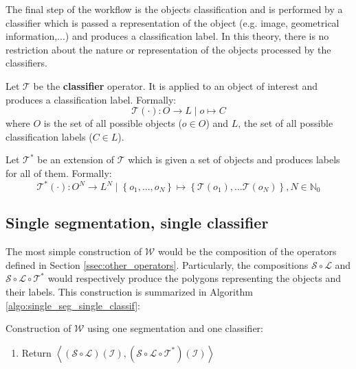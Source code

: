 The final step of the workflow is the objects classification and is performed by a classifier which is passed a representation of the object (e.g. image, geometrical information,...) and produces a classification label. In this theory, there is no restriction about the nature or representation of the objects processed by the classifiers.

\begin{definition} \label{def:classif_op}
Let $\mathcal{T}$ be the \textbf{classifier} operator. It is applied to an object of interest and produces a classification label. Formally:
\begin{equation}
	\mathcal{T}(\cdot) : O \rightarrow L \mid o \mapsto C
\end{equation}
where $O$ is the set of all possible objects ($o \in O$) and $L$, the set of all possible classification labels ($C \in L$). 
\end{definition}
\begin{definition}
Let $\mathcal{T}^*$ be an extension of $\mathcal{T}$ which is given a set of objects and produces labels for all of them. Formally: 
\begin{equation}
	\mathcal{T}^*(\cdot) : O^N \rightarrow L^N \mid \left\{o_1,...,o_N\right\} \mapsto \left\{\mathcal{T}(o_1), ... \mathcal{T}(o_N)\right\}, N \in \mathbb{N}_0
\end{equation}
\end{definition}

\subsection{Single segmentation, single classifier}
\label{ssec:single_single}

The most simple construction of $\mathcal{W}$ would be the composition of the operators defined in Section \ref{ssec:other_operators}. Particularly, the compositions $\mathcal{S} \circ \mathcal{L}$ and $\mathcal{S} \circ \mathcal{L} \circ \mathcal{T}^*$ would respectively produce the polygons representing the objects and their labels. This construction is summarized in Algorithm \ref{algo:single_seg_single_classif}: 

\begin{algorithm} \label{algo:single_seg_single_classif} 
	Construction of $\mathcal{W}$ using one segmentation and one classifier:
	
	\begin{enumerate}
		\item Return $\left\langle\left(\mathcal{S} \circ \mathcal{L}\right)\left(\mathcal{I}\right) , \left(\mathcal{S} \circ \mathcal{L} \circ \mathcal{T}^*\right)\left(\mathcal{I}\right)\right\rangle$
	\end{enumerate}
\end{algorithm}

